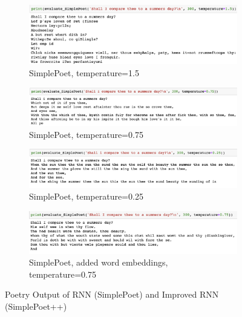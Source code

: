 \documentclass[a4paper,12pt]{article} %
\begin{document}
\begin{figure}[h]
  \centering
  \begin{subfigure}[b]{\textwidth}
    \includegraphics[width=\textwidth]{basic_temp15}
    \caption{SimplePoet, temperature=1.5}
    \label{fig:simple_temp15}
  \end{subfigure}


    \begin{subfigure}[b]{\textwidth}
    \includegraphics[width=\textwidth]{basic_temp075}
    \caption{SimplePoet, temperature=0.75}
    \label{fig:simple_temp075}
    \end{subfigure}


      \begin{subfigure}[b]{\textwidth}
    \includegraphics[width=\textwidth]{basic_temp025}
    \caption{SimplePoet, temperature=0.25}
    \label{fig:simple_temp025}
      \end{subfigure}


        \begin{subfigure}[b]{\textwidth}
    \includegraphics[width=\textwidth]{fancy_temp075}
    \caption{SimplePoet, added word embeddings, temperature=0.75}
    \label{fig:fancy_temp075}
        \end{subfigure}

        \caption{Poetry Output of RNN (SimplePoet) and Improved RNN
          (SimplePoet++)}
        \label{fig:poems}
\end{figure}
\end{document}
